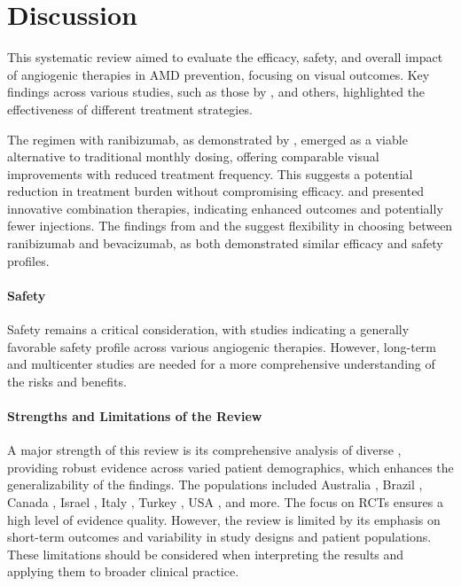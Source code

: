 \section{Discussion}\label{s:discussion}

This systematic review aimed to evaluate the efficacy, safety, and overall impact of angiogenic therapies in AMD prevention, focusing on visual outcomes. Key findings across various studies, such as those by \citet{kertes2019,kertes2020,wykoff2018}, and others, highlighted the effectiveness of different treatment strategies.

The \TreatAndExtend regimen with ranibizumab, as demonstrated by \citet{kertes2019,kertes2020}, emerged as a viable alternative to traditional monthly dosing, offering comparable visual improvements with reduced treatment frequency. This suggests a potential reduction in treatment burden without compromising efficacy. \citet{russo2018} and \citet{semeraro2015} presented innovative combination therapies, indicating enhanced outcomes and potentially fewer injections. The findings from \citet{nunes2019} and the \citet{catt2012} suggest flexibility in choosing between ranibizumab and bevacizumab, as both demonstrated similar efficacy and safety profiles.

\paragraph{Safety}\label{s:safety}
Safety remains a critical consideration, with studies indicating a generally favorable safety profile across various angiogenic therapies. However, long-term and multicenter studies are needed for a more comprehensive understanding of the risks and benefits.

\paragraph{Strengths and Limitations of the Review}\label{s:strengths-imitations}
A major strength of this review is its comprehensive analysis of diverse \RCTs, providing robust evidence across varied patient demographics, which enhances the generalizability of the findings. The populations included Australia \cite{schmidt2011}, Brazil \cite{nunes2019,schmidt2011}, Canada \cite{kertes2019,kertes2020}, Israel \cite{schmidt2011}, Italy \cite{russo2018,semeraro2015}, Turkey \cite{eldem2015,schmidt2011}, USA \cite{wykoff2018,catt2012,ho2014}, and more. The focus on RCTs ensures a high level of evidence quality. However, the review is limited by its emphasis on short-term outcomes and variability in study designs and patient populations. These limitations should be considered when interpreting the results and applying them to broader clinical practice.